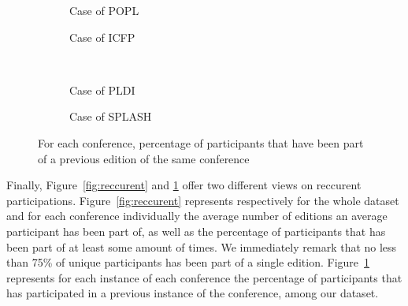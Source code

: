 \begin{figure}
  \centering
  \begin{subfigure}[b]{0.4\textwidth}
    \centering
    \caption{Case of POPL}
  \end{subfigure}
  \begin{subfigure}[b]{0.4\textwidth}
    \centering
    \caption{Case of ICFP}
  \end{subfigure}
  \\
  \begin{subfigure}[b]{0.4\textwidth}
    \centering
    \caption{Case of PLDI}
  \end{subfigure}
  \begin{subfigure}[b]{0.4\textwidth}
    \centering
    \caption{Case of SPLASH}
  \end{subfigure}
  \caption{For each conference, percentage of participants that have been
    part of a previous edition of the same conference }
  \label{fig:old-timers}
\end{figure}

Finally, Figure~\ref{fig:reccurent} and \ref{fig:old-timers} offer two different views on reccurent participations. Figure~\ref{fig:reccurent} represents respectively for the whole dataset and for each conference individually the average number of editions an average participant has been part of, as well as the percentage of participants that has been part of at least some amount of times. We immediately remark that no less than 75\% of unique participants has been part of a single edition.
Figure~\ref{fig:old-timers} represents for each instance of each conference the percentage of participants that has participated in a previous instance of the conference, among our dataset.

